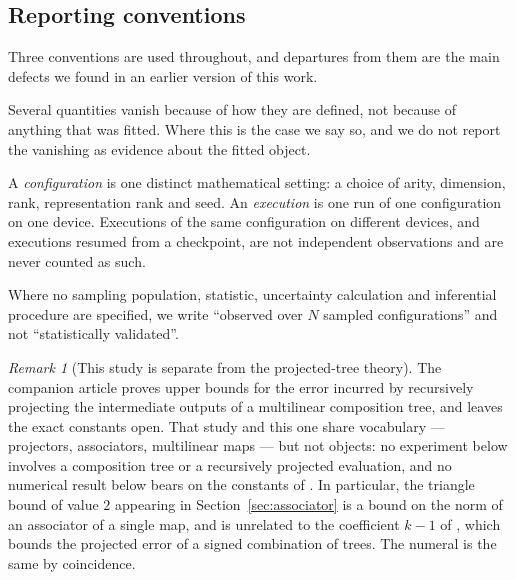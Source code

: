 \documentclass[11pt]{amsart}
\theoremstyle{remark}
\newtheorem{remark}[observation]{Remark}
\begin{document}
\subsection{Reporting conventions}

Three conventions are used throughout, and departures from them are the main defects we
found in an earlier version of this work.

\begin{description}[leftmargin=*]
\item[Identities by construction are labelled as such.] Several quantities vanish because
of how they are defined, not because of anything that was fitted. Where this is the case we
say so, and we do not report the vanishing as evidence about the fitted object.
\item[A configuration is not an execution.] A \emph{configuration} is one distinct
mathematical setting: a choice of arity, dimension, rank, representation rank and seed. An
\emph{execution} is one run of one configuration on one device. Executions of the same
configuration on different devices, and executions resumed from a checkpoint, are not
independent observations and are never counted as such.
\item[Statistical language is used only when a sampling model is stated.] Where no
sampling population, statistic, uncertainty calculation and inferential procedure are
specified, we write ``observed over $N$ sampled configurations'' and not ``statistically
validated''.
\end{description}

\begin{remark}[This study is separate from the projected-tree theory]
\label{rem:separatestudy}
The companion article \cite{ChaveroJassoTrees} proves upper bounds for the error incurred
by recursively projecting the intermediate outputs of a multilinear composition tree, and
leaves the exact constants open. That study and this one share vocabulary --- projectors,
associators, multilinear maps --- but not objects: no experiment below involves a
composition tree or a recursively projected evaluation, and no numerical result below bears
on the constants of \cite{ChaveroJassoTrees}. In particular, the triangle bound of value
$2$ appearing in Section~\ref{sec:associator} is a bound on the norm of an associator of a
single map, and is unrelated to the coefficient $k-1$ of \cite{ChaveroJassoTrees}, which
bounds the projected error of a signed combination of trees. The numeral is the same by
coincidence.
\end{remark}
\end{document}
